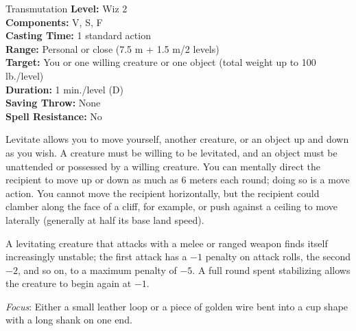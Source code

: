 {Transmutation}
{
	\textbf{Level:}
	Wiz 2\\
	\textbf{Components:}
	V, S, F\\
	\textbf{Casting Time:}
	1 standard action\\
	\textbf{Range:}
	Personal or close (7.5 m + 1.5 m/2 levels)\\
	\textbf{Target:}
	You or one willing creature or one object (total weight up to 100 lb./level)\\
	\textbf{Duration:}
	1 min./level (D)\\
	\textbf{Saving Throw:}
	None\\
	\textbf{Spell Resistance:}
	No\\
}
{
	Levitate allows you to move yourself, another creature, or an object up and down as you wish. A creature must be willing to be levitated, and an object must be unattended or possessed by a willing creature. You can mentally direct the recipient to move up or down as much as 6 meters each round; doing so is a move action. You cannot move the recipient horizontally, but the recipient could clamber along the face of a cliff, for example, or push against a ceiling to move laterally (generally at half its base land speed).

	A levitating creature that attacks with a melee or ranged weapon finds itself increasingly unstable; the first attack has a $-1$ penalty on attack rolls, the second $-2$, and so on, to a maximum penalty of $-5$. A full round spent stabilizing allows the creature to begin again at $-1$.

	\textit{Focus}:
	Either a small leather loop or a piece of golden wire bent into a cup shape with a long shank on one end.

}
